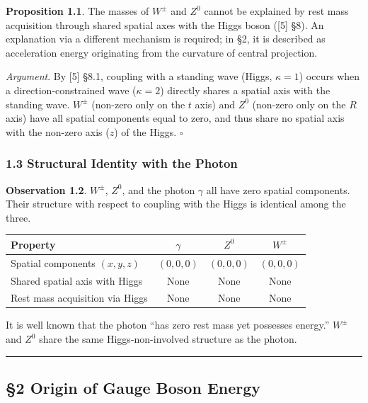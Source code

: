 \documentclass[
  a4paper,11pt]{article}
\newcounter{none}
\theoremstyle{definition}
\theoremstyle{remark}
\begin{document}
\textbf{Proposition 1.1}. The masses of \(W^{\pm}\) and \(Z^0\) cannot
be explained by rest mass acquisition through shared spatial axes with
the Higgs boson ({[}5{]} §8). An explanation via a different mechanism
is required; in §2, it is described as acceleration energy originating
from the curvature of central projection.

\emph{Argument}. By {[}5{]} §8.1, coupling with a standing wave (Higgs,
\(\kappa = 1\)) occurs when a direction-constrained wave
(\(\kappa = 2\)) directly shares a spatial axis with the standing wave.
\(W^{\pm}\) (non-zero only on the \(t\) axis) and \(Z^0\) (non-zero only
on the \(R\) axis) have all spatial components equal to zero, and thus
share no spatial axis with the non-zero axis (\(z\)) of the Higgs.
\(\square\)

\subsubsection{1.3 Structural Identity with the
Photon}\label{structural-identity-with-the-photon}

\textbf{Observation 1.2}. \(W^{\pm}\), \(Z^0\), and the photon
\(\gamma\) all have zero spatial components. Their structure with
respect to coupling with the Higgs is identical among the three.

{\def\LTcaptype{none} %
\begin{longtable}[]{@{}lccc@{}}
\toprule\noalign{}
Property & \(\gamma\) & \(Z^0\) & \(W^{\pm}\) \\
\midrule\noalign{}
\endhead
\bottomrule\noalign{}
\endlastfoot
Spatial components \((x,y,z)\) & \((0,0,0)\) & \((0,0,0)\) &
\((0,0,0)\) \\
Shared spatial axis with Higgs & None & None & None \\
Rest mass acquisition via Higgs & None & None & None \\
\end{longtable}
}

It is well known that the photon ``has zero rest mass yet possesses
energy.'' \(W^{\pm}\) and \(Z^0\) share the same Higgs-non-involved
structure as the photon.

\begin{center}\rule{0.5\linewidth}{0.5pt}\end{center}

\subsection{§2 Origin of Gauge Boson
Energy}\label{origin-of-gauge-boson-energy}
\end{document}
